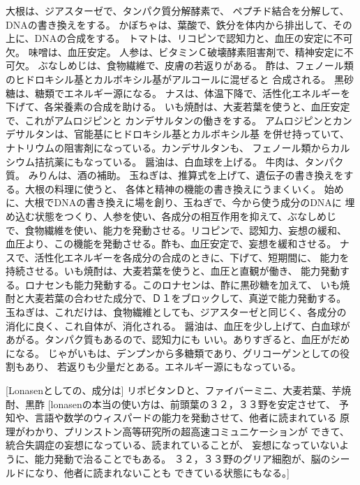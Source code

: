 \documentclass{jsarticle}
\begin{document}
      大根は、ジアスターゼで、タンパク質分解酵素で、
    ペプチド結合を分解して、DNAの書き換えをする。
    かぼちゃは、葉酸で、鉄分を体内から排出して、その上に、DNAの合成をする。
    トマトは、リコピンで認知力と、血圧の安定に不可欠。
    味噌は、血圧安定。 
    人参は、ビタミンＣ破壊酵素阻害剤で、精神安定に不可欠。
    ぶなしめじは、食物繊維で、皮膚の若返りがある。
    酢は、フェノール類のヒドロキシル基とカルボキシル基がアルコールに混ぜると
    合成される。
    黒砂糖は、糖類でエネルギー源になる。
    ナスは、体温下降で、活性化エネルギーを下げて、各栄養素の合成を助ける。
    いも焼酎は、大麦若葉を使うと、血圧安定で、これがアムロジピンと
    カンデサルタンの働きをする。
    アムロジピンとカンデサルタンは、官能基にヒドロキシル基とカルボキシル基
    を併せ持っていて、ナトリウムの阻害剤になっている。カンデサルタンも、
    フェノール類からカルシウム拮抗薬にもなっている。
    醤油は、白血球を上げる。
    牛肉は、タンパク質。
    みりんは、酒の補助。
    玉ねぎは、推算式を上げて、遺伝子の書き換えをする。大根の料理に使うと、
    各体と精神の機能の書き換えにうまくいく。
    始めに、大根でDNAの書き換えに場を創り、玉ねぎで、今から使う成分のDNAに
    埋め込む状態をつくり、人参を使い、各成分の相互作用を抑えて、ぶなしめじ
    で、食物繊維を使い、能力を発動させる。リコピンで、認知力、妄想の緩和、
    血圧より、この機能を発動させる。酢も、血圧安定で、妄想を緩和させる。
    ナスで、活性化エネルギーを各成分の合成のときに、下げて、短期間に、
    能力を持続させる。いも焼酎は、大麦若葉を使うと、血圧と直観が働き、
    能力発動する。ロナセンも能力発動する。このロナセンは、酢に黒砂糖を加えて、
    いも焼酎と大麦若葉の合わせた成分で、Ｄ１をブロックして、真逆で能力発動する。
    玉ねぎは、これだけは、食物繊維としても、ジアスターゼと同じく、各成分の
    消化に良く、これ自体が、消化される。
    醤油は、血圧を少し上げて、白血球があがる。タンパク質もあるので、認知力にも
    いい。ありすぎると、血圧がだめになる。
    じゃがいもは、デンプンから多糖類であり、グリコーゲンとしての役割もあり、
    若返りも少量だとある。エネルギー源にもなっている。

    [Lonasenとしての、成分は]
    リポビタンＤと、ファイバーミニ、大麦若葉、芋焼酎、黒酢
    [lonasenの本当の使い方は、前頭葉の３２，３３野を安定させて、
    予知や、言語や数学のウィスパードの能力を発動させて、他者に読まれている
    原理がわかり、プリンストン高等研究所の超高速コミュニケーションが
    できて、統合失調症の妄想になっている、読まれていることが、
    妄想になっていないように、能力発動で治ることでもある。
    ３２，３３野のグリア細胞が、脳のシールドになり、他者に読まれないことも
    できている状態にもなる。]
\end{document}
